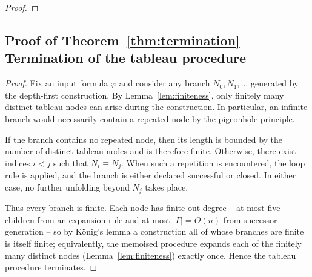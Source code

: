 \begin{proof}
\end{proof}


\subsection{Proof of Theorem~\ref{thm:termination} -- Termination of the tableau procedure}


\begin{proof}
Fix an input formula $\varphi$ and consider any branch $N_0,N_1,\dots$ generated by the depth-first construction.
By Lemma~\ref{lem:finiteness}, only finitely many distinct tableau nodes can arise during the construction. In particular, an infinite branch would necessarily contain a repeated node by the pigeonhole principle.

If the branch contains no repeated node, then its length is bounded by the number of distinct tableau nodes and is therefore finite. Otherwise, there exist indices $i<j$ such that $N_i \equiv N_j$.
When such a repetition is encountered, the loop rule is applied,
and the branch is either declared successful or closed.
In either case, no further unfolding beyond $N_j$ takes place.

Thus every branch is finite. Each node has finite out-degree -- at most five children from an expansion rule and at most $|\Gamma|=O(n)$ from successor generation -- so by König's lemma a construction all of whose branches are finite is itself finite; equivalently, the memoised procedure expands each of the finitely many distinct nodes (Lemma~\ref{lem:finiteness}) exactly once. Hence the tableau procedure terminates.
\end{proof}



